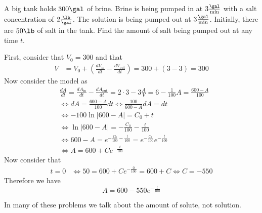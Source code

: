 \documentclass[notes.tex]{subfiles}
\begin{document}
\begin{exercise}
    A big tank holds $300\us{\gal}$ of brine. Brine is being pumped in at $3\frac{\us{\gal}}{\si{\min}}$ with a salt concentration of $2\frac{\us{\lb}}{\us{\gal}}$. The solution is being pumped out at $3\frac{\us{\gal}}{\si{\min}}$. Initially, there are $50\us{\lb}$ of salt in the tank. Find the amount of salt being pumped out at any time $t$.
\end{exercise}
\begin{solution}
    First, consider that $V_0 = 300$ and that
    \begin{align*}
        V
        &= V_0 + \left( \frac{dV_{\mathrm{in}}}{dt} - \frac{dV_{\mathrm{out}}}{dt} \right)
        = 300 + (3 - 3)
        = 300
    \end{align*}
    Now consider the model as
    \begin{align*}
        &\frac{dA}{dt}
        = \frac{dA_{\mathrm{in}}}{dt} - \frac{dA_{\mathrm{out}}}{dt}
        = 2\cdot 3 - 3 \frac{A}{V}
        = 6 - \frac{1}{100}A
        = \frac{600 - A}{100} \\
        &\iff dA = \frac{600 - A}{100}dt
        \iff \frac{100}{600 - A}dA = dt \\
        &\iff -100\ln|600 - A| = C_0 + t \\
        &\iff \ln|600 - A| = -\frac{C_0}{100} - \frac{t}{100} \\
        &\iff 600 - A = e^{-\frac{C_0}{100} - \frac{t}{100}} = e^{-\frac{C_0}{100}}e^{-\frac{t}{100}} \\
        &\iff A = 600 + Ce^{-\frac{t}{100}}
    \end{align*}
    Now consider that
    \begin{align*}
        t = 0
        &\iff 50 = 600 + Ce^{-\frac{0}{100}} = 600 + C
        \iff C = -550
    \end{align*}
    Therefore we have
    \[
        A = 600 - 550e^{-\frac{t}{100}}
    \]
\end{solution}
In many of these problems we talk about the amount of solute, not solution.
\end{document}
